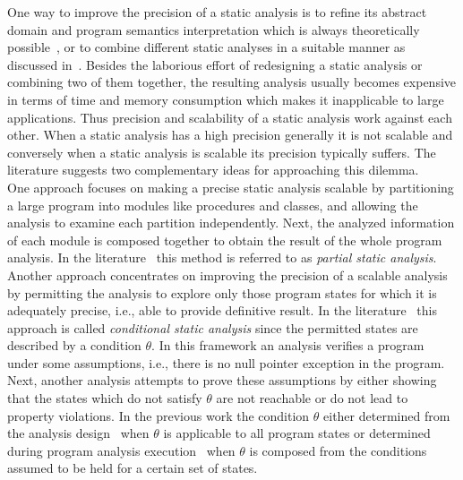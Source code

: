 One way to improve the precision of a static analysis is to refine its abstract domain and program semantics interpretation which is always theoretically possible~\cite{Cousot:1977}, or to combine different static analyses in a suitable manner as discussed in~\cite{Cousot:1979}. Besides the laborious effort of redesigning a static analysis or combining two of them together, the resulting analysis usually becomes expensive in terms of time and memory consumption which makes it inapplicable to large applications. Thus precision and scalability of a static analysis work against each other. When a static analysis has a high precision generally it is not scalable and conversely when a static analysis is scalable its precision typically suffers. The literature suggests two complementary ideas for approaching this dilemma.\\
One approach focuses on making a precise static analysis scalable by partitioning a large program into modules like procedures and classes, and allowing the analysis to examine each partition independently. Next, the analyzed information of each module is composed together to obtain the result of  the whole program analysis. In the literature~\cite{Cousot:2002, Ballabriga:2007} this method is referred to as {\em partial static analysis}.\\
Another approach concentrates on improving the precision of a scalable analysis by permitting the analysis to explore only those program states for which it is adequately precise, i.e., able to provide definitive result. In the literature~\cite{Naik:POPL07,Conway:SAS08, Beyer:Tech11} this approach is called {\em conditional static analysis} since the permitted states are described by a condition $\theta$. In this framework an analysis verifies a program under some assumptions, i.e., there is no null pointer exception in the program. Next, another analysis attempts to prove these assumptions by either showing that the states which do not satisfy $\theta$ are not reachable or do not lead to property violations. In the previous work the condition $\theta$ either determined from the analysis design~\cite{Naik:POPL07,Conway:SAS08} when $\theta$ is applicable to all program states or determined during program analysis execution~\cite{Beyer:Tech11} when $\theta$ is composed from the conditions assumed to be held for a certain set of states.\\
